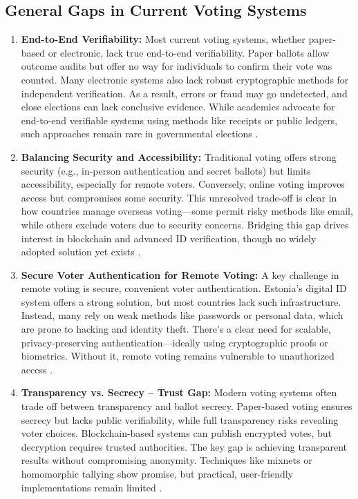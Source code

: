 \documentclass[a4paper,10pt]{report}
\begin{document}
\subsection{General Gaps in Current Voting Systems}

\begin{enumerate}
    \item \textbf{End-to-End Verifiability:} Most current voting systems, whether paper-based or electronic, lack true end-to-end verifiability. Paper ballots allow outcome audits but offer no way for individuals to confirm their vote was counted. Many electronic systems also lack robust cryptographic methods for independent verification. As a result, errors or fraud may go undetected, and close elections can lack conclusive evidence. While academics advocate for end-to-end verifiable systems using methods like receipts or public ledgers, such approaches remain rare in governmental elections \cite{brookings_paper_voting, arxiv_blockchain}.
    
    \item \textbf{Balancing Security and Accessibility:} Traditional voting offers strong security (e.g., in-person authentication and secret ballots) but limits accessibility, especially for remote voters. Conversely, online voting improves access but compromises some security. This unresolved trade-off is clear in how countries manage overseas voting—some permit risky methods like email, while others exclude voters due to security concerns. Bridging this gap drives interest in blockchain and advanced ID verification, though no widely adopted solution yet exists \cite{mdpi_blockchain_voting, pmc_ncbi}.
    
    \item \textbf{Secure Voter Authentication for Remote Voting:} A key challenge in remote voting is secure, convenient voter authentication. Estonia's digital ID system offers a strong solution, but most countries lack such infrastructure. Instead, many rely on weak methods like passwords or personal data, which are prone to hacking and identity theft. There's a clear need for scalable, privacy-preserving authentication—ideally using cryptographic proofs or biometrics. Without it, remote voting remains vulnerable to unauthorized access \cite{uconn_voter, linkedin_blockchain}.
    
    \item \textbf{Transparency vs. Secrecy – Trust Gap:} Modern voting systems often trade off between transparency and ballot secrecy. Paper-based voting ensures secrecy but lacks public verifiability, while full transparency risks revealing voter choices. Blockchain-based systems can publish encrypted votes, but decryption requires trusted authorities. The key gap is achieving transparent results without compromising anonymity. Techniques like mixnets or homomorphic tallying show promise, but practical, user-friendly implementations remain limited \cite{arxiv_blockchain, pmc_ncbi}.
    

\end{enumerate}
\end{document}
